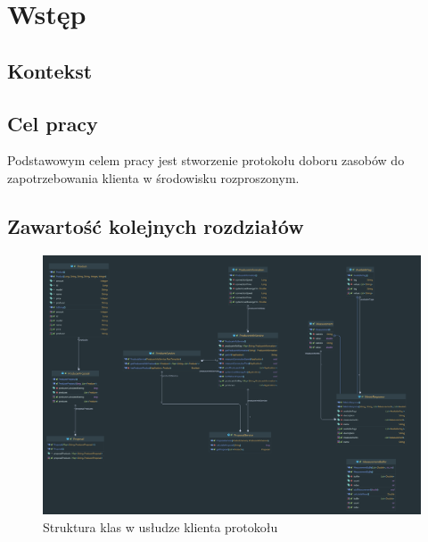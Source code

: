 \chapter{Wstęp}

\section{Kontekst}
\section{Cel pracy}

Podstawowym celem pracy jest stworzenie protokołu doboru zasobów do zapotrzebowania klienta w środowisku rozproszonym.

\section{Zawartość kolejnych rozdziałów}

\begin{figure}[!htbp]
    \centering
    \includegraphics[width=\textwidth]{images/Master-Protocol-Worker.png}
    \caption{Struktura klas w usłudze klienta protokołu}
    \label{fig:enter-label}
\end{figure}
